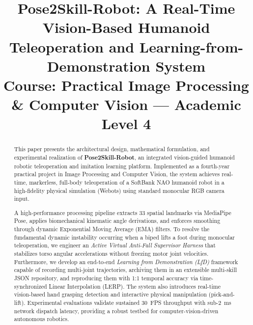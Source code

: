 \documentclass[conference,10pt,twocolumn]{IEEEtran}
\begin{document}
\title{Pose2Skill-Robot: A Real-Time Vision-Based Humanoid Teleoperation and Learning-from-Demonstration System\\
{\footnotesize \textsf{Course: Practical Image Processing \& Computer Vision --- Academic Level 4}}}

\author{
}

\maketitle

\begin{abstract}
This paper presents the architectural design, mathematical formulation, and experimental realization of \textbf{Pose2Skill-Robot}, an integrated vision-guided humanoid robotic teleoperation and imitation learning platform. Implemented as a fourth-year practical project in Image Processing and Computer Vision, the system achieves real-time, markerless, full-body teleoperation of a SoftBank NAO humanoid robot in a high-fidelity physical simulation (Webots) using standard monocular RGB camera input. 

A high-performance processing pipeline extracts 33 spatial landmarks via MediaPipe Pose, applies biomechanical kinematic angle derivations, and enforces smoothing through dynamic Exponential Moving Average (EMA) filters. To resolve the fundamental dynamic instability occurring when a biped lifts a foot during monocular teleoperation, we engineer an \textit{Active Virtual Anti-Fall Supervisor Harness} that stabilizes torso angular accelerations without freezing motor joint velocities. Furthermore, we develop an end-to-end \textit{Learning from Demonstration (LfD)} framework capable of recording multi-joint trajectories, archiving them in an extensible multi-skill JSON repository, and reproducing them with 1:1 temporal accuracy via time-synchronized Linear Interpolation (LERP). The system also introduces real-time vision-based hand grasping detection and interactive physical manipulation (pick-and-lift). Experimental evaluations validate sustained 30~FPS throughput with sub-2~ms network dispatch latency, providing a robust testbed for computer-vision-driven autonomous robotics.
\end{abstract}
\end{document}

